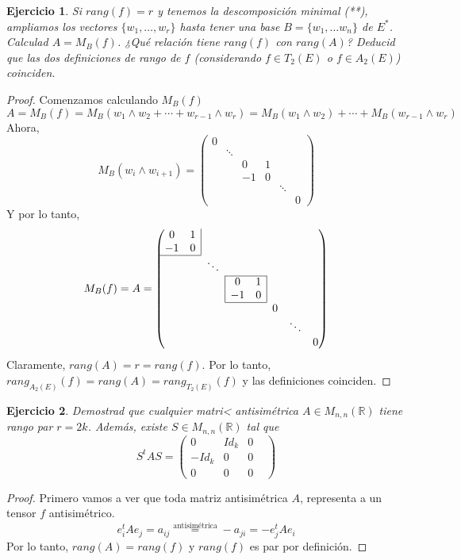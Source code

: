\documentclass[12pt]{article}
\newcommand{\real}{\mathbb{R}}
\theoremstyle{break}
\newtheorem{ej}{Ejercicio}
\newtheorem*{proof}{Demostración}
\begin{document}
\begin{ej}
	Si $rang(f)=r$ y tenemos la descomposición minimal (**), ampliamos los vectores
	$\{w_1,\dots, w_r\}$ hasta tener una base $B = \{w_1, \dots w_n\}$ de $E^*$. Calculad
	$A = M_B(f)$. ¿Qué relación tiene $rang(f)$ con $rang(A)$? Deducid que las dos
	definiciones de rango de $f$ (considerando $f \in T_2(E)$ o $f \in A_2(E)$) coinciden.
\end{ej}
\begin{proof}
	Comenzamos calculando $M_B(f)$
	\[
		A = M_B(f) = M_B(w_1 \wedge w_2 + \cdots + w_{r-1} \wedge w_r) = M_B(w_1 \wedge w_2)
		+ \cdots + M_B(w_{r-1} \wedge w_r)
	\]
	Ahora,
	\[
		M_B(w_i \wedge w_{i+1}) = \begin{pmatrix}
			0 \\ & \ddots \\ & & 0 & 1 \\ & & -1 & 0 \\ & & & & \ddots \\ & & & & & 0
		\end{pmatrix}
	\]
	Y por lo tanto,
	\[
		M_B(f) = A = \begin{pmatrix}
			0 & \multicolumn{1}{c|}{1} \\ -1 & \multicolumn{1}{c|}{0} 
			\\ \cline{1-2} && \ddots \\ \cline{4-5}
			&&& \multicolumn{1}{|c}{0} & \multicolumn{1}{c|}{1} \\
			&&&\multicolumn{1}{|c}{-1} & \multicolumn{1}{c|}{0} \\
			\cline{4-5}
			&&&&& 0 \\&&&&&& \ddots \\ &&&&&&& 0
		\end{pmatrix}
	\]
	Claramente, $rang(A)=r= rang(f)$. Por lo tanto, $rang_{A_2(E)}(f) = rang(A) =
	rang_{T_2(E)}(f)$ y las definiciones coinciden.
\end{proof}

\begin{ej}
	Demostrad que cualquier matri< antisimétrica $A \in M_{n,n}(\real)$ tiene rango par
	$r = 2k$. Además, existe $S \in M_{n,n}(\real)$ tal que
	\[
		S^tAS = \begin{pmatrix}
			0 & Id_k & 0 &\\ -Id_k & 0 & 0 & \\ 0 & 0 & 0
		\end{pmatrix}
	\]
\end{ej}
\begin{proof}
	Primero vamos a ver que toda matriz antisimétrica $A$, representa a un tensor $f$
	antisimétrico.
	\[
		e_i^t Ae_j = a_{ij} \stackrel{\text{antisimétrica}}{=} -a_{ji} = - e_j^tAe_i
	\]
	Por lo tanto, $rang(A) = rang(f)$ y $rang(f)$ es par por definición.
\end{proof}
\end{document}

